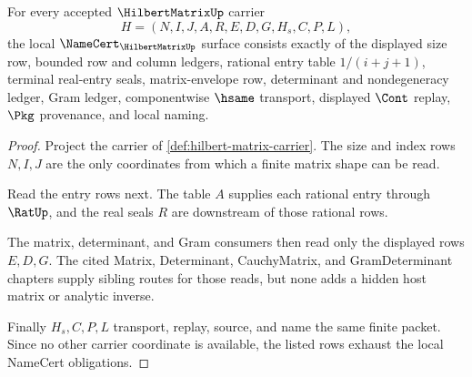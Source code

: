\begin{theorem}
\label{thm:hilbert-matrix-namecert-obligations}
For every accepted $\HilbertMatrixUp$ carrier
$$
H=(N,I,J,A,R,E,D,G,H_s,C,P,L),
$$
the local $\NameCert_{\HilbertMatrixUp}$ surface consists exactly of the displayed size row, bounded row and column ledgers, rational entry table $1/(i+j+1)$, terminal real-entry seals, matrix-envelope row, determinant and nondegeneracy ledger, Gram ledger, componentwise $\hsame$ transport, displayed $\Cont$ replay, $\Pkg$ provenance, and local naming.
\end{theorem}
\begin{proof}
Project the carrier of \autoref{def:hilbert-matrix-carrier}. The size and index rows $N,I,J$ are the only coordinates from which a finite matrix shape can be read.

Read the entry rows next. The table $A$ supplies each rational entry through $\RatUp$, and the real seals $R$ are downstream of those rational rows.

The matrix, determinant, and Gram consumers then read only the displayed rows $E,D,G$. The cited Matrix, Determinant, CauchyMatrix, and GramDeterminant chapters supply sibling routes for those reads, but none adds a hidden host matrix or analytic inverse.

Finally $H_s,C,P,L$ transport, replay, source, and name the same finite packet. Since no other carrier coordinate is available, the listed rows exhaust the local NameCert obligations.
\end{proof}

